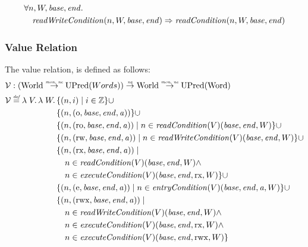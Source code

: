\documentclass{article}
\newcommand{\monnefun}{\stackrel{\textit{\tiny{mon, ne}}}{\rightarrow}}
\newcommand{\nefun}{\stackrel{\textit{\tiny{ne}}}{\rightarrow}}
\newcommand{\defeq}{\stackrel{\textit{\tiny{def}}}{=}}
\newcommand{\union}{\mathbin{\cup}}
\newcommand{\var}[1]{\mathit{#1}}
\newcommand{\addr}{\var{a}}
\newcommand{\start}{\var{base}}
\newcommand{\addrend}{\var{end}}
\newcommand{\perm}{\var{perm}}
\newcommand{\stdcap}[1][\perm]{\left(#1,\start,\addrend,\addr \right)}
\newcommand{\plainfun}[2]{
  \ifthenelse{\equal{#2}{}}
             {\mathit{#1}}
             {\mathit{#1}(#2)}
}
\newcommand{\readCond}[1]{\plainfun{readCondition}{#1}}
\newcommand{\writeCond}[1]{\plainfun{readWriteCondition}{#1}}
\newcommand{\execCond}[1]{\plainfun{executeCondition}{#1}}
\newcommand{\entryCond}[1]{\plainfun{entryCondition}{#1}}
\newcommand{\asmType}{\plaindom{AsmType}}
\newcommand{\plaindom}[1]{\mathrm{#1}}
\newcommand{\Words}{\plaindom{Word}}
\newcommand{\ints}{\mathbb{Z}}
\newcommand{\Worlds}{\plaindom{World}}
\newcommand{\UPred}[1]{\plaindom{UPred}(#1)}
\newcommand{\intr}[2]{\mathcal{#1}}
\newcommand{\valueintr}[1]{\intr{V}{#1}}
\newcommand{\stdvr}{\valueintr{\asmType}}
\newcommand{\npair}[2][n]{\left(#1,#2 \right)}
\newcommand{\plainperm}[1]{\mathrm{#1}}
\newcommand{\noperm}{\plainperm{o}}
\newcommand{\readonly}{\plainperm{ro}}
\newcommand{\readwrite}{\plainperm{rw}}
\newcommand{\exec}{\plainperm{rx}}
\newcommand{\entry}{\plainperm{e}}
\newcommand{\rwx}{\plainperm{rwx}}
\begin{document}
\begin{lemma}
\label{lem:wc-implies-rc}
  \begin{align*}
    &\forall n, W, \start, \addrend \ldotp\\ 
    &\quad \writeCond{n,W,\start,\addrend} \Rightarrow \readCond{n,W,\start,\addrend}
  \end{align*}
\end{lemma}


\subsubsection{Value Relation}
\label{subsubsec:value-relation}
The value relation, is defined as follows:
\begin{align*}
  \stdvr & :  (\Worlds \monnefun \UPred{Words}) \nefun \Worlds \monnefun \UPred{\Words} \\
  \stdvr &\defeq \lambda \; V \ldotp \lambda \; W \ldotp 
              \begin{aligned}[t]
  & \{ \npair{i} \mid i \in \ints \} 
    \union \\
         & \{ \npair{\stdcap[\noperm] }  \} 
           \union \\
         & \{ \npair{\stdcap[\readonly] } \mid n \in \readCond{}(V)(\start,\addrend,W) \} \union \\
         & \{ \npair{\stdcap[\readwrite] } \mid n \in \writeCond{}(V)(\start,\addrend,W) \} \union \\
         & \{ \npair{\stdcap[\exec]} \mid \\
         & \quad n \in \readCond{}(V)(\start,\addrend,W) \land \\
         & \quad n \in \execCond{}(V)(\start,\addrend,\exec,W) \}
           \union \\
         & \{ \npair{\stdcap[\entry]} \mid n \in \entryCond{}(V)(\start,\addrend,\addr,W) \} \union \\
         & \{ \npair{\stdcap[\rwx]} \mid \\
         & \quad n \in \writeCond{}(V)(\start,\addrend,W) \land \\
         & \quad n \in \execCond{}(V)(\start,\addrend,\exec,W) \land \\
         & \quad n \in \execCond{}(V)(\start,\addrend,\rwx,W) \}
       \end{aligned}
\end{align*}
\end{document}
